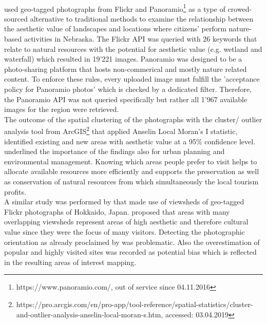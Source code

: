 \paragraph*{\textcite{Figueroa-Alfaro2017}} used geo-tagged photographs from Flickr and Panoramio\footnote{https://www.panoramio.com/, out of service since 04.11.2016} as a type of crowed-sourced alternative to traditional methods to examine the relationship between the aesthetic value of landscapes and locations where citizens' perform nature-based activities in Nebraska. The Flickr API was queried with 26 keywords that relate to natural resources with the potential for aesthetic value (e.g. wetland and waterfall) which resulted in 19'221 images. Panoramio was designed to be a photo-sharing platform that hosts non-commerical and mostly nature related content. To enforce these rules, every uploaded image must fulfill the 'acceptance policy for Panoramio photos' which is checked by a dedicated filter. Therefore, the Panoramio API was not queried specifically but rather all 1'967 available images for the region were retrieved.\\
The outcome of the spatial clustering of the photographs with the cluster/ outlier analysis tool from ArcGIS\footnote{https://pro.arcgis.com/en/pro-app/tool-reference/spatial-statistics/cluster-and-outlier-analysis-anselin-local-moran-s.htm, accessed: 03.04.2019} that applied Anselin Local Moran's I statistic, identified existing and new areas with aesthetic value at a 95\% confidence level. \citeauthor{Figueroa-Alfaro2017} underlined the importance of the findings also for urban planning and environmental management. Knowing which areas people prefer to visit helps to allocate available resources more efficiently and supports the preservation as well as conservation of natural resources from which simultaneously the local tourism profits. \\
\newline
A similar study was performed by \textcite{Yoshimura2017} that made use of viewsheds of geo-tagged Flickr photographs of Hokkaido, Japan. \citeauthor{Yoshimura2017} proposed that areas with many overlapping viewsheds represent areas of high aesthetic and therefore cultural value since they were the focus of many visitors. Detecting the photographic orientation as already proclaimed by \textcite{Unknown2013} was problematic. Also the overestimation of popular and highly visited sites was recorded as potential bias which is reflected in the resulting areas of interest mapping.


